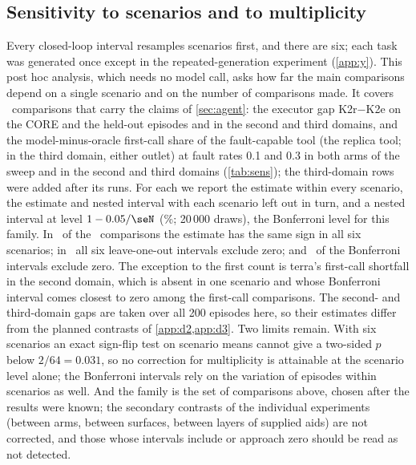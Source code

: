 \subsection{Sensitivity to scenarios and to multiplicity}\label{app:sens}
Every closed-loop interval resamples scenarios first, and there are six; each task was generated once except in the repeated-generation experiment (\cref{app:y}).
This post hoc analysis, which needs no model call, asks how far the main comparisons depend on a single scenario and on the number of comparisons made.
It covers \seN\ comparisons that carry the claims of \cref{sec:agent}: the executor gap K2r$-$K2e on the CORE and the held-out episodes and in the second and third domains, and the model-minus-oracle first-call share of the fault-capable tool (the replica tool; in the third domain, either outlet) at fault rates 0.1 and 0.3 in both arms of the sweep and in the second and third domains (\cref{tab:sens}); the third-domain rows were added after its runs.
For each we report the estimate within every scenario, the estimate and nested interval with each scenario left out in turn, and a nested interval at level $1-0.05/\seN$ (\seBonfLevel\%; 20\,000 draws), the Bonferroni level for this family.
In \seSameSign\ of the \seN\ comparisons the estimate has the same sign in all six scenarios; in \seLosoOk\ all six leave-one-out intervals exclude zero; and \seBonfOk\ of the Bonferroni intervals exclude zero. The exception to the first count is terra's first-call shortfall in the second domain, which is absent in one scenario and whose Bonferroni interval comes closest to zero among the first-call comparisons. The second- and third-domain gaps are taken over all 200 episodes here, so their estimates differ from the planned contrasts of \cref{app:d2,app:d3}.
Two limits remain. With six scenarios an exact sign-flip test on scenario means cannot give a two-sided $p$ below $2/64=0.031$, so no correction for multiplicity is attainable at the scenario level alone; the Bonferroni intervals rely on the variation of episodes within scenarios as well.
And the family is the set of comparisons above, chosen after the results were known; the secondary contrasts of the individual experiments (between arms, between surfaces, between layers of supplied aids) are not corrected, and those whose intervals include or approach zero should be read as not detected.

\begin{table}[!htbp]
\centering
\caption{Sensitivity of the main comparisons (post hoc). Estimate with a nested 95\% interval from this analysis's bootstrap (it can differ slightly from the planned-contrast tables); number of scenarios in which the estimate has the pooled sign; range of the estimate when one scenario is left out, and whether all six leave-one-out 95\% intervals exclude zero; nested interval at the Bonferroni level for the \seN\ comparisons. Regret in regret units, first-call shares in points.}
\label{tab:sens}
\scriptsize\setlength{\tabcolsep}{3pt}
\resizebox{\linewidth}{!}{}
\end{table}
